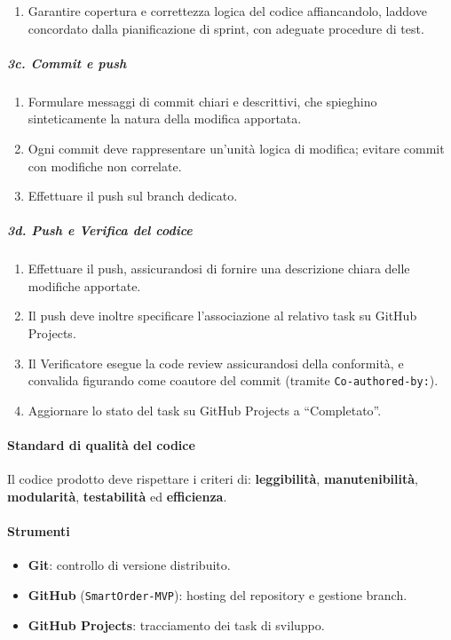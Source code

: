 \documentclass[a4paper, 11pt, oneside]{scrartcl}
\begin{document}
\begin{enumerate}
\begin{itemize}
              \item Inserire commenti inline (\texttt{// x} oppure \texttt{\# x}) per chiarire logiche aggrovigliate o procedure workaround non elementari.
              \item Impiegare i marcatori \texttt{TODO} e \texttt{FIXME} per evidenziare debiti tecnici e implementazioni monche da risolvere nei cicli successivi.
          \end{itemize}
    \item Garantire copertura e correttezza logica del codice affiancandolo, laddove concordato dalla pianificazione di sprint, con adeguate procedure di test.
\end{enumerate}

\subparagraph{3c. Commit e push}
\begin{enumerate}
    \item Formulare messaggi di commit{\scriptsize{}} chiari e descrittivi, che spieghino sinteticamente la natura della modifica apportata.
    \item Ogni commit deve rappresentare un'unità logica di modifica; evitare commit con modifiche non correlate.
    \item Effettuare il push sul branch dedicato.
\end{enumerate}

\subparagraph{3d. Push e Verifica del codice}
\begin{enumerate}
    \item Effettuare il push, assicurandosi di fornire una descrizione chiara delle modifiche apportate.
    \item Il push deve inoltre specificare l'associazione al relativo task su GitHub Projects.
    \item Il Verificatore esegue la code review assicurandosi della conformità, e convalida figurando come coautore del commit (tramite \texttt{Co-authored-by:}).
    \item Aggiornare lo stato del task su GitHub Projects a ``Completato''.
\end{enumerate}

\paragraph{Standard di qualità del codice}
Il codice prodotto deve rispettare i criteri di: \textbf{leggibilità}, \textbf{manutenibilità}, \textbf{modularità}, \textbf{testabilità} ed \textbf{efficienza}.

\paragraph{Strumenti}
\begin{itemize}
    \item \textbf{Git}: controllo di versione distribuito.
    \item \textbf{GitHub} (\texttt{SmartOrder-MVP}): hosting del repository e gestione branch.
    \item \textbf{GitHub Projects}: tracciamento dei task di sviluppo.
\end{itemize}
\end{document}

